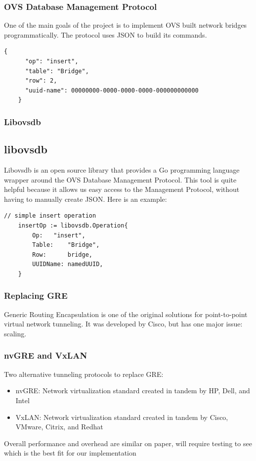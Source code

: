 \documentclass[pdf]{beamer}
\begin{document}
\begin{frame}[fragile]
	\frametitle{OVS Database Management Protocol}
	One of the main goals of the project is to implement OVS built network
	bridges programmatically. The protocol uses JSON to build its commands.
	\\
	\begin{lstlisting}[caption=Example insert OVS DB Management Protocol]
	{
	  "op": "insert",
	  "table": "Bridge",
	  "row": 2,
	  "uuid-name": 00000000-0000-0000-0000-000000000000
	}
	\end{lstlisting}
\end{frame}

\begin{frame}[fragile]
	\frametitle{Libovsdb}
	\subsection{libovsdb}
	Libovsdb is an open source library that provides a Go programming
	language wrapper around the OVS Database Management Protocol. This tool
	is quite helpful because it allows us easy access to the Management
	Protocol, without having to manually create JSON. Here is
	an example:\cite{gosample} \\

\begin{lstlisting}[caption=Example insert operation using libovsdb]
	// simple insert operation
	insertOp := libovsdb.Operation{
	    Op:	  "insert",
	    Table:	  "Bridge",
	    Row:	  bridge,
	    UUIDName: namedUUID,
	}

\end{lstlisting}
\end{frame}
\begin{frame}
	\frametitle{Replacing GRE}
	Generic Routing Encapsulation is one of the original solutions for 
	point-to-point virtual network tunneling. It was developed by Cisco, but
	has one major issue: scaling.
\end{frame}
\begin{frame}
	\frametitle{nvGRE and VxLAN}
	Two alternative tunneling protocols to replace GRE:
	\begin{itemize}
		\item nvGRE: Network virtualization standard created in tandem
			by HP, Dell, and Intel
		\item VxLAN: Network virtualization standard created in tandem
			by Cisco, VMware, Citrix, and Redhat
	\end{itemize}
	Overall performance and overhead are similar on paper, will require
	testing to see which is the best fit for our implementation
\end{frame}
\end{document}

